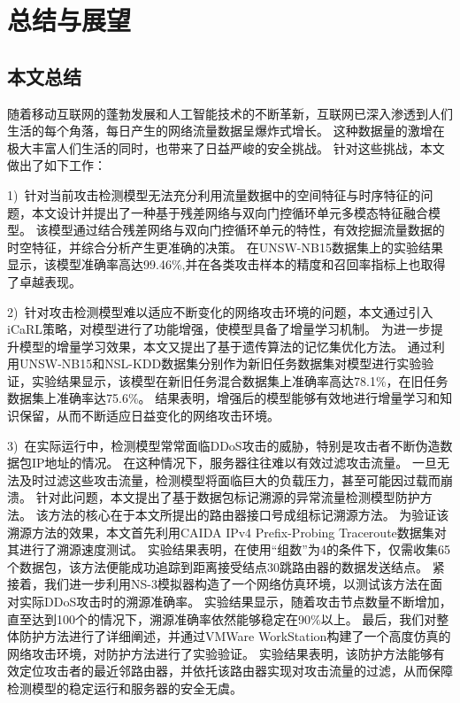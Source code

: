 \chapter{总结与展望}
\label{cha:over_view}

\section{本文总结}


随着移动互联网的蓬勃发展和人工智能技术的不断革新，互联网已深入渗透到人们生活的每个角落，每日产生的网络流量数据呈爆炸式增长。
这种数据量的激增在极大丰富人们生活的同时，也带来了日益严峻的安全挑战。
针对这些挑战，本文做出了如下工作：\par
1)~针对当前攻击检测模型无法充分利用流量数据中的空间特征与时序特征的问题，本文设计并提出了一种基于残差网络与双向门控循环单元多模态特征融合模型。
该模型通过结合残差网络与双向门控循环单元的特性，有效挖掘流量数据的时空特征，并综合分析产生更准确的决策。
在UNSW-NB15数据集上的实验结果显示，该模型准确率高达99.46\%,并在各类攻击样本的精度和召回率指标上也取得了卓越表现。\par

2)~针对攻击检测模型难以适应不断变化的网络攻击环境的问题，本文通过引入iCaRL策略，对模型进行了功能增强，使模型具备了增量学习机制。
为进一步提升模型的增量学习效果，本文又提出了基于遗传算法的记忆集优化方法。
通过利用UNSW-NB15和NSL-KDD数据集分别作为新旧任务数据集对模型进行实验验证，实验结果显示，该模型在新旧任务混合数据集上准确率高达78.1\%，在旧任务数据集上准确率达75.6\%。
结果表明，增强后的模型能够有效地进行增量学习和知识保留，从而不断适应日益变化的网络攻击环境。\par


3)~在实际运行中，检测模型常常面临DDoS攻击的威胁，特别是攻击者不断伪造数据包IP地址的情况。
在这种情况下，服务器往往难以有效过滤攻击流量。
一旦无法及时过滤这些攻击流量，检测模型将面临巨大的负载压力，甚至可能因过载而崩溃。
针对此问题，本文提出了基于数据包标记溯源的异常流量检测模型防护方法。
该方法的核心在于本文所提出的路由器接口号成组标记溯源方法。
为验证该溯源方法的效果，本文首先利用CAIDA IPv4 Prefix-Probing Traceroute数据集对其进行了溯源速度测试。
实验结果表明，在使用“组数”为4的条件下，仅需收集65个数据包，该方法便能成功追踪到距离接受结点30跳路由器的数据发送结点。
紧接着，我们进一步利用NS-3模拟器构造了一个网络仿真环境，以测试该方法在面对实际DDoS攻击时的溯源准确率。
实验结果显示，随着攻击节点数量不断增加，直至达到100个的情况下，溯源准确率依然能够稳定在90\%以上。
最后，我们对整体防护方法进行了详细阐述，并通过VMWare WorkStation构建了一个高度仿真的网络攻击环境，对防护方法进行了实验验证。
实验结果表明，该防护方法能够有效定位攻击者的最近邻路由器，并依托该路由器实现对攻击流量的过滤，从而保障检测模型的稳定运行和服务器的安全无虞。

